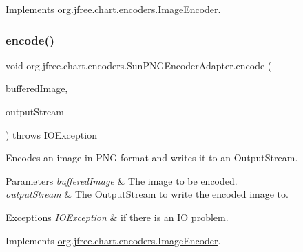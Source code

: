 Implements \mbox{\hyperlink{interfaceorg_1_1jfree_1_1chart_1_1encoders_1_1_image_encoder_a3290449de5246d80ca626835e5dac183}{org.\+jfree.\+chart.\+encoders.\+Image\+Encoder}}.

\mbox{\label{classorg_1_1jfree_1_1chart_1_1encoders_1_1_sun_p_n_g_encoder_adapter_ad1bb8a4e33cc9a8b6b259c0955d807f1}} 
\subsubsection{\texorpdfstring{encode()}{encode()}\hspace{0.1cm}{\footnotesize\ttfamily [2/2]}}
{\footnotesize\ttfamily void org.\+jfree.\+chart.\+encoders.\+Sun\+P\+N\+G\+Encoder\+Adapter.\+encode (\begin{DoxyParamCaption}\item[{Buffered\+Image}]{buffered\+Image,  }\item[{Output\+Stream}]{output\+Stream }\end{DoxyParamCaption}) throws I\+O\+Exception}

Encodes an image in P\+NG format and writes it to an Output\+Stream.


\begin{DoxyParams}{Parameters}
{\em buffered\+Image} & The image to be encoded. \\
\hline
{\em output\+Stream} & The Output\+Stream to write the encoded image to. \\
\hline
\end{DoxyParams}

\begin{DoxyExceptions}{Exceptions}
{\em I\+O\+Exception} & if there is an IO problem. \\
\hline
\end{DoxyExceptions}


Implements \mbox{\hyperlink{interfaceorg_1_1jfree_1_1chart_1_1encoders_1_1_image_encoder_ad9396ba6a8a9c6f490a31f36f2226dac}{org.\+jfree.\+chart.\+encoders.\+Image\+Encoder}}.

\mbox{\label{classorg_1_1jfree_1_1chart_1_1encoders_1_1_sun_p_n_g_encoder_adapter_aa1012f037f19d693fec4e86da1d5f785}} 
